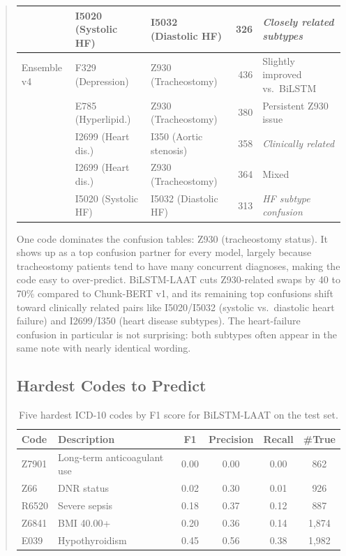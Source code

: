 \documentclass[11pt,a4paper]{article}
\begin{document}
\begin{abstract}
\begin{table}[H]
{\begin{tabular}{l l l r l}
            & I5020 (Systolic HF)    & I5032 (Diastolic HF)    & 326 & \textit{Closely related subtypes} \\
\midrule
Ensemble v4 & F329 (Depression)      & Z930 (Tracheostomy)     & 436 & Slightly improved vs.\ BiLSTM \\
            & E785 (Hyperlipid.)     & Z930 (Tracheostomy)     & 380 & Persistent Z930 issue \\
            & I2699 (Heart dis.)     & I350 (Aortic stenosis)  & 358 & \textit{Clinically related} \\
            & I2699 (Heart dis.)     & Z930 (Tracheostomy)     & 364 & Mixed \\
            & I5020 (Systolic HF)    & I5032 (Diastolic HF)    & 313 & \textit{HF subtype confusion} \\
\bottomrule
\end{tabular}}
\end{table}

One code dominates the confusion tables: Z930 (tracheostomy status). It shows up as a top confusion partner for every model, largely because tracheostomy patients tend to have many concurrent diagnoses, making the code easy to over-predict. BiLSTM-LAAT cuts Z930-related swaps by 40 to 70\% compared to Chunk-BERT v1, and its remaining top confusions shift toward clinically related pairs like I5020/I5032 (systolic vs.\ diastolic heart failure) and I2699/I350 (heart disease subtypes). The heart-failure confusion in particular is not surprising: both subtypes often appear in the same note with nearly identical wording.

\subsection{Hardest Codes to Predict}

\begin{table}[H]
\centering
\caption{Five hardest ICD-10 codes by F1 score for BiLSTM-LAAT on the test set.}
\label{tab:hardest_codes}
\small
\begin{tabular}{llcccc}
\toprule
\textbf{Code} & \textbf{Description} & \textbf{F1} & \textbf{Precision} & \textbf{Recall} & \textbf{\#True} \\
\midrule
Z7901 & Long-term anticoagulant use & 0.00 & 0.00 & 0.00 & 862 \\
Z66   & DNR status                  & 0.02 & 0.30 & 0.01 & 926 \\
R6520 & Severe sepsis               & 0.18 & 0.37 & 0.12 & 887 \\
Z6841 & BMI 40.00+                   & 0.20 & 0.36 & 0.14 & 1,874 \\
E039  & Hypothyroidism              & 0.45 & 0.56 & 0.38 & 1,982 \\
\bottomrule
\end{tabular}
\end{table}


\end{abstract}
\end{document}

